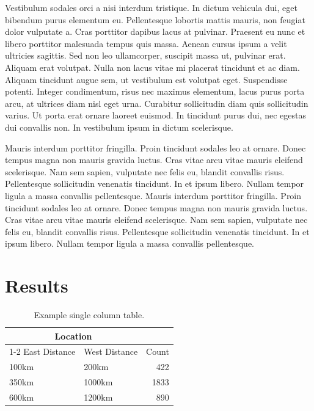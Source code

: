 \documentclass[
	a4paper, %
	10pt, %
	unnumberedsections, %
	twoside, %
]{LTJournalArticle}
\begin{document}
Vestibulum sodales orci a nisi interdum tristique. In dictum vehicula dui, eget bibendum purus elementum eu. Pellentesque lobortis mattis mauris, non feugiat dolor vulputate a. Cras porttitor dapibus lacus at pulvinar. Praesent eu nunc et libero porttitor malesuada tempus quis massa. Aenean cursus ipsum a velit ultricies sagittis. Sed non leo ullamcorper, suscipit massa ut, pulvinar erat. Aliquam erat volutpat. Nulla non lacus vitae mi placerat tincidunt et ac diam. Aliquam tincidunt augue sem, ut vestibulum est volutpat eget. Suspendisse potenti. Integer condimentum, risus nec maximus elementum, lacus purus porta arcu, at ultrices diam nisl eget urna. Curabitur sollicitudin diam quis sollicitudin varius. Ut porta erat ornare laoreet euismod. In tincidunt purus dui, nec egestas dui convallis non. In vestibulum ipsum in dictum scelerisque.

Mauris interdum porttitor fringilla. Proin tincidunt sodales leo at ornare. Donec tempus magna non mauris gravida luctus. Cras vitae arcu vitae mauris eleifend scelerisque. Nam sem sapien, vulputate nec felis eu, blandit convallis risus. Pellentesque sollicitudin venenatis tincidunt. In et ipsum libero. Nullam tempor ligula a massa convallis pellentesque. Mauris interdum porttitor fringilla. Proin tincidunt sodales leo at ornare. Donec tempus magna non mauris gravida luctus. Cras vitae arcu vitae mauris eleifend scelerisque. Nam sem sapien, vulputate nec felis eu, blandit convallis risus. Pellentesque sollicitudin venenatis tincidunt. In et ipsum libero. Nullam tempor ligula a massa convallis pellentesque.


\section{Results}

\begin{table} %
	\caption{Example single column table.}
	\centering
	\begin{tabular}{l l r}
		\toprule
		\multicolumn{2}{c}{Location} \\
		\cmidrule(r){1-2}
		East Distance & West Distance & Count \\
		\midrule
		100km & 200km & 422 \\
		350km & 1000km & 1833 \\
		600km & 1200km & 890 \\
		\bottomrule
	\end{tabular}
	\label{tab:distcounts}
\end{table}
\end{document}
